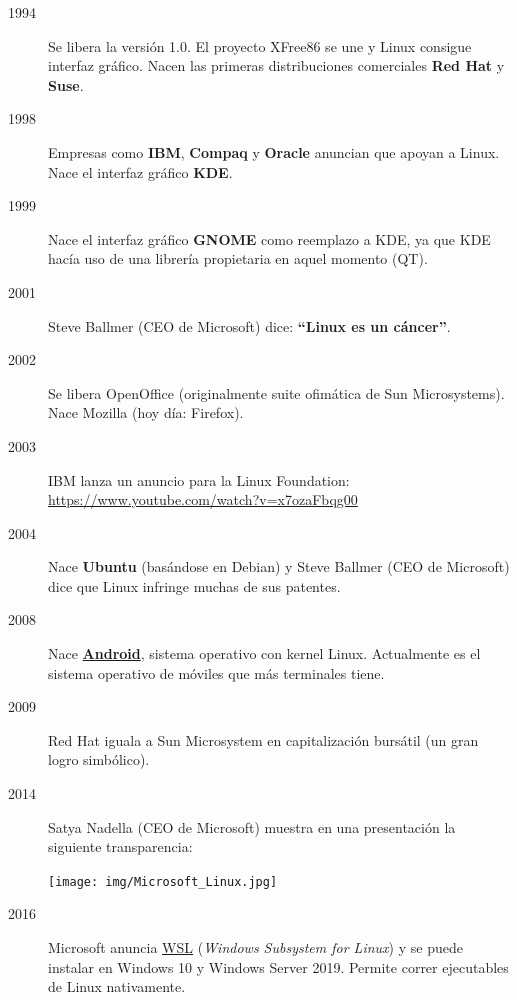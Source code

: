\documentclass{../../../yukibook.cls/yukibook}
\begin{document}
\begin{description}
\item[1994] Se libera la versión 1.0. El proyecto XFree86 se une y Linux consigue interfaz gráfico. Nacen las primeras distribuciones comerciales \textbf{Red Hat} y \textbf{Suse}.

\item[1998] Empresas como \textbf{IBM}, \textbf{Compaq} y \textbf{Oracle} anuncian que apoyan a Linux. Nace el interfaz gráfico \textbf{KDE}.

\item[1999] Nace el interfaz gráfico \textbf{GNOME} como reemplazo a KDE, ya que KDE hacía uso de una librería propietaria en aquel momento (QT).

\item[2001] Steve Ballmer (CEO de Microsoft) dice: \textbf{“Linux es un cáncer”}.

\item[2002] Se libera OpenOffice (originalmente suite ofimática de Sun Microsystems). Nace Mozilla (hoy día:  Firefox).

\item[2003] IBM lanza un anuncio para la Linux Foundation: \href{https://www.youtube.com/watch?v=x7ozaFbqg00}{https://www.youtube.com/watch?v=x7ozaFbqg00}

\item[2004] Nace \textbf{Ubuntu} (basándose en Debian) y Steve Ballmer (CEO de Microsoft) dice que Linux infringe muchas de sus patentes.

\item[2008] Nace \textbf{\href{https://es.wikipedia.org/wiki/Android}{Android}}, sistema operativo con kernel Linux. Actualmente es el sistema operativo de móviles que más terminales tiene.

\item[2009] Red Hat iguala a Sun Microsystem en capitalización bursátil (un gran logro simbólico).

\item[2014] Satya Nadella (CEO de Microsoft) muestra en una presentación la siguiente transparencia:

\begin{center}
  \texttt{[image: img/Microsoft\_Linux.jpg]}
  \vspace{-10pt}
\end{center}


\item[2016]
Microsoft anuncia \href{https://es.wikipedia.org/wiki/Windows_Subsystem_for_Linux}{WSL} (\textit{Windows Subsystem for Linux}) y se puede instalar en Windows 10 y Windows Server 2019. Permite correr ejecutables de Linux nativamente.

\end{description}
\end{document}
